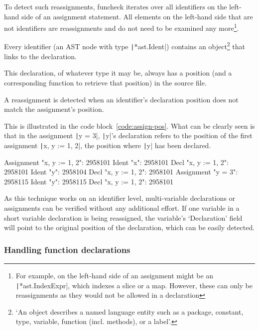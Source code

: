 To detect such reassignments, funcheck iterates over all identifiers on the left-hand side
of an assignment statement.
All elements on the left-hand side that are not identifiers are reassignments and do not need
to be examined any more\footnote{For example, on the left-hand side of an assignment might be an
    \texttt|*ast.IndexExpr|, which indexes a slice or a map. However, these
can only be reassignments as they would not be allowed in a declaration}.

Every identifier (an AST node with type \texttt|*ast.Ident|) contains an object\footnote{`An
    object describes a named language entity such as a package, constant, type, variable,
function (incl. methods), or a label'\autocite{go-ast-object}.} that links to the declaration.

This declaration, of whatever type it may be, always has a position (and a corresponding function
to retrieve that position) in the source file.

A reassignment is detected when an identifier's declaration position does not match the assignment's
position.

This is illustrated in the code block~\ref{code:assign-pos}. What can be clearly seen is that in
the assignment \texttt|y = 3|, \texttt|y|'s declaration refers to the position
of the first assignment \texttt|x, y := 1, 2|, the position where \texttt|y| has
been declared.

\begin{code}
    \begin{gocode}
Assignment "x, y := 1, 2": 2958101
        Ident "x": 2958101
                Decl "x, y := 1, 2": 2958101
        Ident "y": 2958104
                Decl "x, y := 1, 2": 2958101
Assignment "y = 3": 2958115
        Ident "y": 2958115
                Decl "x, y := 1, 2": 2958101
    \end{gocode}
  \label{code:assign-pos}
\end{code}
As this technique works on an identifier level, multi-variable declarations or assignments
can be verified without any additional effort. If one variable in a short variable declaration
is being reassigned, the variable's `Declaration' field will point to the original position
of the declaration, which can be easily detected.

\subsubsection{Handling function declarations}

